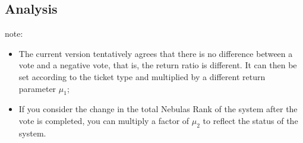\subsection{Analysis}

note:
\begin{itemize}
\item The current version tentatively agrees that there is no difference between a vote and a negative vote, that is, the return ratio is different. It can then be set according to the ticket type and multiplied by a different return parameter $\mu_1$;
\item If you consider the change in the total Nebulas Rank of the system after the vote is completed, you can multiply a factor of $\mu_2$ to reflect the status of the system.
\end{itemize}



